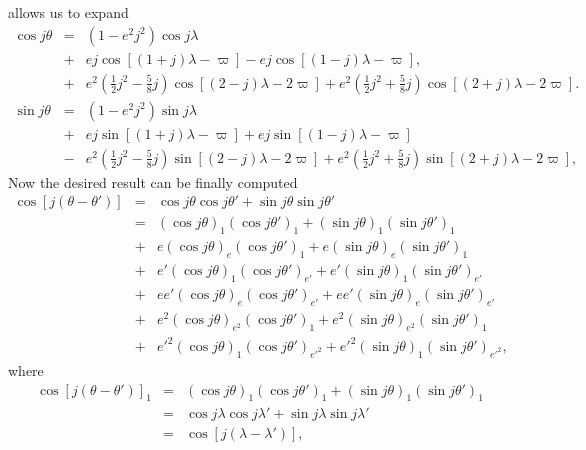 \documentclass [12pt, a4paper] {article}
\begin{document}
allows us to expand 
\begin {eqnarray}
    \cos j\theta 
    &=&
    (1 - e^2j^2)\cos j\lambda 
    \\\nonumber
    &+&
    ej\cos[(1+j)\lambda - \varpi] - ej\cos[(1-j)\lambda - \varpi],
    \\\nonumber
    &+&
    e^2
    \left(
        \frac{1}{2}j^2 - \frac{5}{8}j
    \right)
    \cos[(2 - j)\lambda - 2\varpi]
    +
    e^2
    \left(
        \frac{1}{2}j^2 + \frac{5}{8}j
    \right)
    \cos[(2 + j)\lambda - 2\varpi].
    \\
    \sin j\theta
    &=& 
    (1 - e^2j^2)\sin j\lambda
    \\\nonumber
    &+&
    ej\sin[(1 + j)\lambda - \varpi] + ej\sin[(1 - j)\lambda - \varpi]
    \\\nonumber
    &-&
    e^2\left(
        \frac{1}{2}j^2
        -
        \frac{5}{8}j
    \right)\sin[(2 - j)\lambda - 2\varpi]
    +
    e^2\left(
        \frac{1}{2}j^2
        +
        \frac{5}{8}j
    \right)\sin[(2 + j)\lambda - 2\varpi],
\end {eqnarray}
Now the desired result can be finally computed 
\begin {eqnarray}
    \cos[j(\theta - \theta')]
    &=& 
    \cos j\theta\cos j\theta' + \sin j\theta\sin j\theta'
    \\
    &=& 
    (\cos j\theta)_1(\cos j\theta')_1 + (\sin j\theta)_1(\sin j\theta')_1 
    \\\nonumber
    &+& 
    e(\cos j\theta)_e(\cos j\theta')_1 + e(\sin j\theta)_e(\sin j\theta')_1 
    \\\nonumber
    &+&
    e'(\cos j\theta)_1(\cos j\theta')_{e'} + e'(\sin j\theta)_1(\sin j\theta')_{e'} 
    \\\nonumber
    &+&
    ee'(\cos j\theta)_e(\cos j\theta')_{e'} + ee'(\sin j\theta)_e(\sin j\theta')_{e'} 
    \\\nonumber
    &+&
    e^2(\cos j\theta)_{e^2}(\cos j\theta')_{1} + e^2(\sin j\theta)_{e^2}(\sin j\theta')_{1} 
    \\\nonumber
    &+&
    e'^2(\cos j\theta)_{1}(\cos j\theta')_{e'^2} + e'^2(\sin j\theta)_{1}(\sin j\theta')_{e'^2}, 
\end {eqnarray}
where 
\begin {eqnarray}
    \cos[j(\theta - \theta')]_1 
    &=&
    (\cos j\theta)_1(\cos j\theta')_1 + (\sin j\theta)_1(\sin j\theta')_1
    \\
    &=&
    \cos j\lambda\cos j\lambda' + \sin j\lambda\sin j\lambda' 
    \\
    &=& 
    \cos[j(\lambda - \lambda')],
\end {eqnarray}
\end{document}
